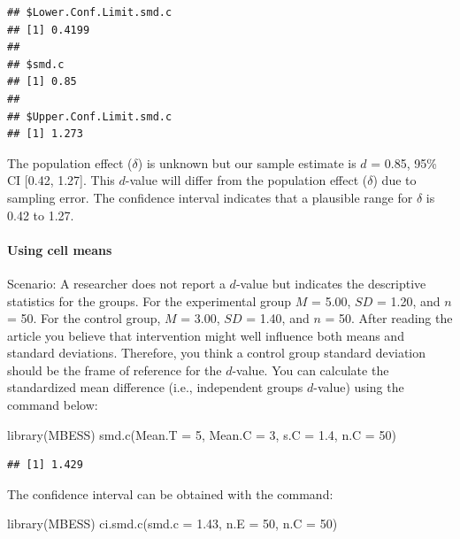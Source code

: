 \documentclass[
]{krantz}
\makeatletter
\newenvironment{Shaded}{\begin{snugshade}}{\end{snugshade}}
\newcommand{\AttributeTok}[1]{\textcolor[rgb]{0.61,0.61,0.61}{#1}}
\newcommand{\DecValTok}[1]{\textcolor[rgb]{0.06,0.06,0.06}{#1}}
\newcommand{\FloatTok}[1]{\textcolor[rgb]{0.06,0.06,0.06}{#1}}
\newcommand{\FunctionTok}[1]{\textcolor[rgb]{0,0,0}{#1}}
\newcommand{\NormalTok}[1]{#1}
\newenvironment{kframe}{%
\medskip{}
\setlength{\fboxsep}{.8em}
 \def\at@end@of@kframe{}%
 \ifinner\ifhmode%
  \def\at@end@of@kframe{\end{minipage}}%
  \begin{minipage}{\columnwidth}%
 \fi\fi%
 \def\FrameCommand##1{\hskip\@totalleftmargin \hskip-\fboxsep
 \colorbox{shadecolor}{##1}\hskip-\fboxsep
     \hskip-\linewidth \hskip-\@totalleftmargin \hskip\columnwidth}%
 \MakeFramed {\advance\hsize-\width
   \@totalleftmargin\z@ \linewidth\hsize
   \@setminipage}}%
 {\par\unskip\endMakeFramed%
 \at@end@of@kframe}
\renewenvironment{Shaded}{\begin{kframe}}{\end{kframe}}
\makeatother
\begin{document}
\begin{verbatim}
## $Lower.Conf.Limit.smd.c
## [1] 0.4199
## 
## $smd.c
## [1] 0.85
## 
## $Upper.Conf.Limit.smd.c
## [1] 1.273
\end{verbatim}

The population effect (\(\delta\)) is unknown but our sample estimate is \(d\) = 0.85, 95\% CI {[}0.42, 1.27{]}. This \(d\)-value will differ from the population effect (\(\delta\)) due to sampling error. The confidence interval indicates that a plausible range for \(\delta\) is 0.42 to 1.27.

\hypertarget{using-cell-means}{%
\paragraph{Using cell means}\label{using-cell-means}}

Scenario: A researcher does not report a \(d\)-value but indicates the descriptive statistics for the groups. For the experimental group \(M\) = 5.00, \(SD\) = 1.20, and \(n\) = 50. For the control group, \(M\) = 3.00, \(SD\) = 1.40, and \(n\) = 50. After reading the article you believe that intervention might well influence both means and standard deviations. Therefore, you think a control group standard deviation should be the frame of reference for the \(d\)-value. You can calculate the standardized mean difference (i.e., independent groups \(d\)-value) using the command below:

\begin{Shaded}
\begin{Highlighting}[]
\FunctionTok{library}\NormalTok{(MBESS)}
\FunctionTok{smd.c}\NormalTok{(}\AttributeTok{Mean.T =} \DecValTok{5}\NormalTok{,}
    \AttributeTok{Mean.C =} \DecValTok{3}\NormalTok{, }
    \AttributeTok{s.C =} \FloatTok{1.4}\NormalTok{, }
    \AttributeTok{n.C =} \DecValTok{50}\NormalTok{) }
\end{Highlighting}
\end{Shaded}

\begin{verbatim}
## [1] 1.429
\end{verbatim}

The confidence interval can be obtained with the command:

\begin{Shaded}
\begin{Highlighting}[]
\FunctionTok{library}\NormalTok{(MBESS)}
\FunctionTok{ci.smd.c}\NormalTok{(}\AttributeTok{smd.c =} \FloatTok{1.43}\NormalTok{, }\AttributeTok{n.E =} \DecValTok{50}\NormalTok{, }\AttributeTok{n.C =} \DecValTok{50}\NormalTok{) }
\end{Highlighting}
\end{Shaded}
\end{document}
